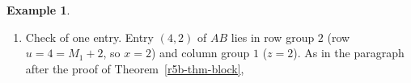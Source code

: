 \documentclass[12pt]{article}
\theoremstyle{definition}
\newtheorem{example}[theorem]{Example}
\begin{document}
\begin{example}
\begin{enumerate}
\[\begin{aligned}
=\begin{pmatrix}3&2&1\\0&-1&-1\end{pmatrix}\\
(AB)_{12}&=A_{11}B_{12}+I_2=\begin{pmatrix}2&2\\2&-2\end{pmatrix}+I_2=\begin{pmatrix}3&2\\2&-1\end{pmatrix}\\
(AB)_{21}&=A_{21}B_{11}+A_{22}B_{21}=\begin{pmatrix}2&2&2\\2&2&2\\2&2&2\end{pmatrix}+\begin{pmatrix}2&0&-2\\0&1&-1\\1&1&-2\end{pmatrix}
=\begin{pmatrix}4&2&0\\2&3&1\\3&3&0\end{pmatrix}\\
(AB)_{22}&=A_{21}B_{12}+A_{22}=\begin{pmatrix}2&2\\2&2\\2&2\end{pmatrix}+\begin{pmatrix}2&0\\0&1\\1&1\end{pmatrix}
=\begin{pmatrix}4&2\\2&3\\3&3\end{pmatrix}
\end{aligned}
\]
So
\[
AB=\left(\begin{array}{ccc|cc}3&2&1&3&2\\0&-1&-1&2&-1\\\hline4&2&0&4&2\\2&3&1&2&3\\3&3&0&3&3\end{array}\right)
\]
\item Check of one entry. Entry \((4,2)\) of \(AB\) lies in row group \(2\) (row \(u=4=M_1+2\),
so \(x=2\)) and column group \(1\) (\(z=2\)). As in the paragraph after the proof of Theorem~\ref{r5b-thm-block},

\end{enumerate}
\end{example}
\end{document}
